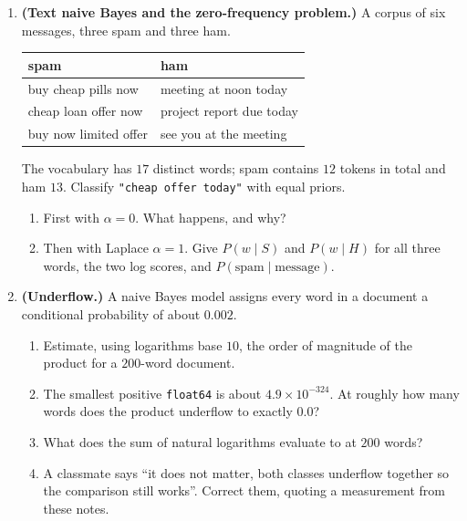 \documentclass[11pt]{article}
\begin{document}
\begin{enumerate}[leftmargin=*, itemsep=0.55em]
\item \textbf{(Text naive Bayes and the zero-frequency problem.)} A corpus of
  six messages, three spam and three ham.

  \begin{center}\small
  \begin{tabular}{@{}ll@{}}
  \toprule
  \textbf{spam} & \textbf{ham}\\
  \midrule
  buy cheap pills now & meeting at noon today\\
  cheap loan offer now & project report due today\\
  buy now limited offer & see you at the meeting\\
  \bottomrule
  \end{tabular}
  \end{center}

  The vocabulary has $17$ distinct words; spam contains $12$ tokens in total
  and ham $13$. Classify \texttt{"cheap offer today"} with equal priors.
  \begin{enumerate}[label=(\alph*)]
    \item First with $\alpha = 0$. What happens, and why?
    \item Then with Laplace $\alpha = 1$. Give $P(w \mid S)$ and
      $P(w \mid H)$ for all three words, the two log scores, and
      $P(\text{spam} \mid \text{message})$.
  \end{enumerate}

\item \textbf{(Underflow.)} A naive Bayes model assigns every word in a
  document a conditional probability of about $0.002$.
  \begin{enumerate}[label=(\alph*)]
    \item Estimate, using logarithms base $10$, the order of magnitude of the
      product for a $200$-word document.
    \item The smallest positive \texttt{float64} is about
      $4.9 \times 10^{-324}$. At roughly how many words does the product
      underflow to exactly $0.0$?
    \item What does the sum of natural logarithms evaluate to at $200$ words?
    \item A classmate says ``it does not matter, both classes underflow
      together so the comparison still works''. Correct them, quoting a
      measurement from these notes.
  \end{enumerate}


\end{enumerate}
\end{document}
